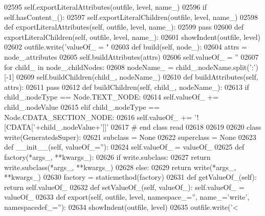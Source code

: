 \begin{DoxyCode}
{{{{{{{{{{{{{{{{{{{{{{{{{{{{{{{{{{{{{{{{{{{{{{{{{{{{{{{{{{{{{{{{{{{{{{{{{{{{{{{{{{{{{{{{{{{{{{{{{{{{{{{{{{{{{{{{{{{{{{{{{{{{{{{{{{{{{{{{{{{{{{{{{{{{{{{{{{{{{{{{{{{{{{{{{{{{{{{{{{{{{{{{02595         self.exportLiteralAttributes(outfile, level, name\_)
02596         \textcolor{keywordflow}{if} self.hasContent_():
02597             self.exportLiteralChildren(outfile, level, name\_)
02598     \textcolor{keyword}{def }exportLiteralAttributes(self, outfile, level, name\_):
02599         \textcolor{keywordflow}{pass}
02600     \textcolor{keyword}{def }exportLiteralChildren(self, outfile, level, name\_):
02601         showIndent(outfile, level)
02602         outfile.write(\textcolor{stringliteral}{'valueOf\_ = "%
02603     \textcolor{keyword}{def }build(self, node\_):
02604         attrs = node\_.attributes
02605         self.buildAttributes(attrs)
02606         self.valueOf_ = \textcolor{stringliteral}{''}
02607         \textcolor{keywordflow}{for} child\_ \textcolor{keywordflow}{in} node\_.childNodes:
02608             nodeName\_ = child\_.nodeName.split(\textcolor{stringliteral}{':'})[-1]
02609             self.buildChildren(child\_, nodeName\_)
02610     \textcolor{keyword}{def }buildAttributes(self, attrs):
02611         \textcolor{keywordflow}{pass}
02612     \textcolor{keyword}{def }buildChildren(self, child\_, nodeName\_):
02613         \textcolor{keywordflow}{if} child\_.nodeType == Node.TEXT\_NODE:
02614             self.valueOf\_ += child\_.nodeValue
02615         \textcolor{keywordflow}{elif} child\_.nodeType == Node.CDATA\_SECTION\_NODE:
02616             self.valueOf\_ += \textcolor{stringliteral}{'![CDATA['}+child\_.nodeValue+\textcolor{stringliteral}{']]'}
02617 \textcolor{comment}{# end class read}
02618 
02619 
02620 \textcolor{keyword}{class }write(GeneratedsSuper):
02621     subclass = \textcolor{keywordtype}{None}
02622     superclass = \textcolor{keywordtype}{None}
02623     \textcolor{keyword}{def }__init__(self, valueOf\_=''):
02624         self.valueOf_ = valueOf\_
02625     \textcolor{keyword}{def }factory(*args\_, **kwargs\_):
02626         \textcolor{keywordflow}{if} write.subclass:
02627             \textcolor{keywordflow}{return} write.subclass(*args\_, **kwargs\_)
02628         \textcolor{keywordflow}{else}:
02629             \textcolor{keywordflow}{return} write(*args\_, **kwargs\_)
02630     factory = staticmethod(factory)
02631     \textcolor{keyword}{def }getValueOf_(self): \textcolor{keywordflow}{return} self.valueOf\_
02632     \textcolor{keyword}{def }setValueOf_(self, valueOf\_): self.valueOf\_ = valueOf\_
02633     \textcolor{keyword}{def }export(self, outfile, level, namespace\_='', name\_='write', namespacedef\_=''):
02634         showIndent(outfile, level)
02635         outfile.write(\textcolor{stringliteral}{'<%
}}}}}}}}}}}}}}}}}}}}}}}}}}}}}}}}}}}}}}}}}}}}}}}}}}}}}}}}}}}}}}}}}}}}}}}}}}}}}}}}}}}}}}}}}}}}}}}}}}}}}}}}}}}}}}}}}}}}}}}}}}}}}}}}}}}}}}}}}}}}}}}}}}}}}}}}}}}}}}}}}}}}}}}}}}}}}}}}}}}}}}}}}}
\end{DoxyCode}
